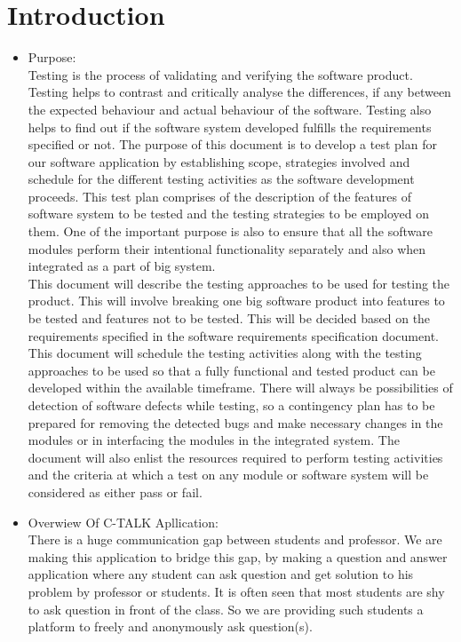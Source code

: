 \documentclass[12pt]{article}
\begin{document}
\section{Introduction}
\begin{itemize}
    \item Purpose:\\
    Testing is the process of validating and verifying the software product. Testing helps to contrast and critically analyse the differences, if any between the expected behaviour and actual behaviour of the software. Testing also helps to find out if the software system developed fulfills the requirements specified or not. The purpose of this document is to develop a test plan for our software application by establishing scope, strategies involved and schedule for the different testing activities as the software development proceeds. This test plan comprises of the description of the features of software system to be tested and the testing strategies to be employed on them. One of the important purpose is also to ensure that all the software modules perform their intentional functionality separately and also when integrated as a part of big system. \\ This document will describe the testing approaches to be used for testing the product. This will involve breaking one big software product into features to be tested and features not to be tested. This will be decided based on the requirements specified in the software requirements specification document. This document will schedule the testing activities along with the testing approaches to be used so that a fully functional and tested product can be developed within the available timeframe. There will always be possibilities of detection of software defects while testing, so a contingency plan has to be prepared for removing the detected bugs and make necessary changes in the modules or in interfacing the modules in the integrated system. The document will also enlist the resources required to perform testing activities and the criteria at which a test on any module or software system will be considered as either pass or fail.
    \item Overwiew Of C-TALK Apllication:\\
    There is a huge communication gap between students and professor. We are making this application to bridge this gap, by making a question and answer application where any student can ask question and get solution to his problem by professor or students. It is often seen that most students are shy to ask question in front of the class. So we are providing such students a platform to freely and anonymously ask question(s).

\end{itemize}
\end{document}
